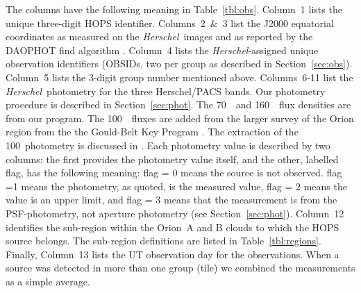 \documentclass[manuscript]{aastex}
\newcommand{\herschel}{{\em Herschel}}
\begin{document}
The columns have the following meaning in Table~\ref{tbl:obs}.  Column~1 lists the unique three-digit HOPS identifier.  Columns~2~\&~3 list the J2000 equatorial coordinates as measured on the \herschel\ images and as reported by the DAOPHOT find algorithm \citep{psfphotometry}.  Column~4 lists the \herschel-assigned unique observation identifiers (OBSIDs, two per group as described in Section~\ref{sec:obs}).  Column~5 lists the 3-digit group number mentioned above.  Columns~6-11 list the \herschel\ photometry for the three Herschel/PACS bands.  Our photometry procedure is described in Section~\ref{sec:phot}.  The 70~\micron\ and 160~\micron\ flux densities are from our program.  The 100~\micron\ fluxes are added from the larger survey of the Orion region from the the Gould-Belt Key Program \citep{gb}.  The extraction of the 100\micron\ photometry is discussed in \cite{pbrpaper}.  Each photometry value is described by two columns: the first provides the photometry value itself, and the other, labelled flag, has the following meaning:   flag = 0 means the source is not observed. flag =1 means the photometry, as quoted, is the measured value,  flag = 2 means the value is an upper limit, and flag = 3 means that the measurement is from the PSF-photometry, not aperture photometry (see Section~\ref{sec:phot}).  Column~12 identifies the sub-region within the Orion~A and B clouds to which the HOPS source belongs.  The sub-region definitions are listed in Table~\ref{tbl:regions}.  Finally, Column~13 lists the UT observation day for the observations.  When a source was detected in more than one group (tile) we combined the measurements as a simple average.
\end{document}
